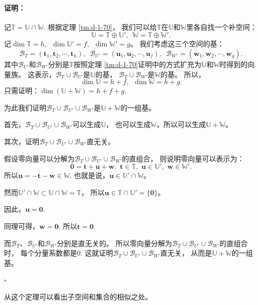 \documentclass[12pt,UTF8]{ctexbook}
\renewenvironment{proof}{\paragraph{\textbf{证明：}}}{\hfill$\square$}
\newtheorem{sk}{思考}[section]
\begin{document}
\begin{appendix}
\begin{proof}
    记$\mathbb{T} = \mathbb{U} \cap \mathbb{W}$. 根据定理 \ref{tm:d-1-70}，
    我们可以给$\mathbb{T}$在$\mathbb{U}$和$\mathbb{W}$里各自找一个补空间：
    $$ \mathbb{U} = \mathbb{T} \oplus \mathbb{U}', \,\,\, \mathbb{W} = \mathbb{T} \oplus \mathbb{W}'.$$
    记$\dim \mathbb{T} = h, \,\,\, \dim \mathbb{U}' = f, \,\,\, \dim \mathbb{W}' = g$。
    我们考虑这三个空间的基：
    $$ \mathcal{B}_T = (\mathbf{t}_1, \mathbf{t}_2, \cdots, \mathbf{t}_h), \,\,\, \mathcal{B}_{U'} = (\mathbf{u}_1, \mathbf{u}_2, \cdots, \mathbf{u}_f), \,\,\, \mathcal{B}_{W'} = (\mathbf{w}_1, \mathbf{w}_2, \cdots, \mathbf{w}_g). $$  
    其中$\mathcal{B}_{U'}$和$\mathcal{B}_{W'}$分别是$\mathbb{T}$按照定理 
    \ref{tm:d-1-70}证明中的方式扩充为$\mathbb{U}$和$\mathbb{W}$时得到的向量族。
    这表示，$\mathcal{B}_T\cup\mathcal{B}_{U'}$是$\mathbb{U}$的基，
    $\mathcal{B}_T\cup\mathcal{B}_{W'}$是$\mathbb{W}$的基。
    所以，
    $$\dim \mathbb{U} = h + f,\,\,\,\dim \mathbb{W} = h + g.$$
    只需证明：$ \dim (\mathbb{U} + \mathbb{W}) = h + f + g.$

    为此我们证明$\mathcal{B}_T\cup\mathcal{B}_{U'}\cup\mathcal{B}_{W'}$是$\mathbb{U} + \mathbb{W}$的一组基。

    首先，$\mathcal{B}_T\cup\mathcal{B}_{U'}\cup\mathcal{B}_{W'}$可以生成$\mathbb{U}$，
    也可以生成$\mathbb{W}$，所以可以生成$\mathbb{U} + \mathbb{W}$。

    其次，证明$\mathcal{B}_T\cup\mathcal{B}_{U'}\cup\mathcal{B}_{W'}$直无关。

    假设零向量可以分解为$\mathcal{B}_T\cup\mathcal{B}_{U'}\cup\mathcal{B}_{W'}$的直组合，
    则说明零向量可以表示为：
    $$ \mathbf{0} = \mathbf{t} + \mathbf{u} + \mathbf{w}. \,\,\,\mathbf{t}\in\mathbb{T},\,\,\mathbf{u}\in\mathbb{U}',\,\,\mathbf{w}\in\mathbb{W}'.$$
    所以$\mathbf{u} = -\mathbf{t} - \mathbf{w} \in \mathbb{W}$.
    也就是说，$\mathbf{u}\in \mathbb{U}'\cap\mathbb{W}$。

    然而$\mathbb{U}'\cap\mathbb{W} \subset \mathbb{U}\cap\mathbb{W} = \mathbb{T}$，
    所以$\mathbf{u}\in\mathbb{T}\cap\mathbb{U}' = \{\mathbf{0}\}$。

    因此，$\mathbf{u} = \mathbf{0}.$

    同理可得，$\mathbf{w} = \mathbf{0}.$ 所以$\mathbf{t} = \mathbf{0}.$

    而$\mathcal{B}_T$、$\mathcal{B}_{U'}$和$\mathcal{B}_{W'}$分别是直无关的。
    所以零向量分解为$\mathcal{B}_T\cup\mathcal{B}_{U'}\cup\mathcal{B}_{W'}$的直组合时，
    每个分量系数都是0. 
    这就证明$\mathcal{B}_T\cup\mathcal{B}_{U'}\cup\mathcal{B}_{W'}$直无关，
    从而是$\mathbb{U} + \mathbb{W}$的一组基。

\end{proof}

从这个定理可以看出子空间和集合的相似之处。


\end{appendix}
\end{document}
